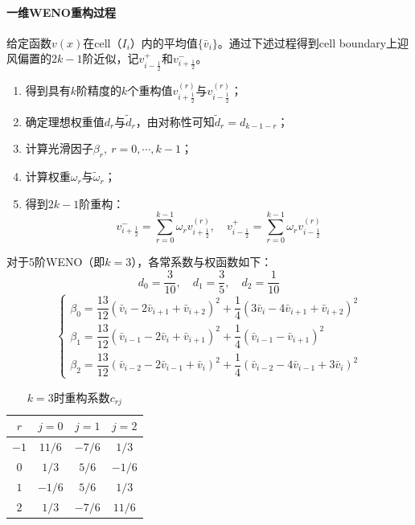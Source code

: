 \documentclass[11pt]{article}
\begin{document}
\paragraph{一维WENO重构过程} 给定函数$v(x)$在cell（$I_i$）内的平均值$\{\bar{v}_i\}$。通过下述过程得到cell boundary上迎风偏置的$2k-1$阶近似，记$v_{i-\frac{1}{2}}^+$和$v_{i+\frac{1}{2}}^-$。
\begin{enumerate}
	\item 得到具有$k$阶精度的$k$个重构值$v_{i+\frac{1}{2}}^{(r)}$与$v_{i-\frac{1}{2}}^{(r)}$；
	\item 确定理想权重值$d_r$与$\tilde{d}_r$，由对称性可知$\tilde{d}_r=d_{k-1-r}$；
	\item 计算光滑因子$\beta_r,\ r=0,\cdots,k-1$；
	\item 计算权重$\omega_r$与$\tilde{\omega}_r$；
	\item 得到$2k-1$阶重构：
	      $$
		      v_{i+\frac{1}{2}}^-=\sum_{r=0}^{k-1}\omega_rv_{i+\frac{1}{2}}^{(r)},\quad v_{i-\frac{1}{2}}^+=\sum_{r=0}^{k-1}\omega_rv_{i-\frac{1}{2}}^{(r)}
	      $$
\end{enumerate}

对于5阶WENO（即$k=3$），各常系数与权函数如下：
\begin{equation}
	d_0=\frac{3}{10},\quad d_1=\frac{3}{5},\quad d_2=\frac{1}{10}
\end{equation}
\begin{equation}
	\left\{\begin{array}{l}
		\beta_0 =\dfrac{13}{12}\left(\bar{v}_{i}-2\bar{v}_{i+1}+\bar{v}_{i+2}\right)^2+\dfrac{1}{4}\left(3\bar{v}_{i}-4\bar{v}_{i+1}+\bar{v}_{i+2}\right)^2 \\[8pt]
		\beta_1 =\dfrac{13}{12}\left(\bar{v}_{i-1}-2\bar{v}_{i}+\bar{v}_{i+1}\right)^2+\dfrac{1}{4}\left(\bar{v}_{i-1}-\bar{v}_{i+1}\right)^2               \\[8pt]
		\beta_2 =\dfrac{13}{12}\left(\bar{v}_{i-2}-2\bar{v}_{i-1}+\bar{v}_{i}\right)^2+\dfrac{1}{4}\left(\bar{v}_{i-2}-4\bar{v}_{i-1}+3\bar{v}_{i}\right)^2
	\end{array}\right.
\end{equation}
\begin{table}[htbp]
	\centering
	\caption{\label{tab:crj}$k=3$时重构系数$c_{rj}$}\vspace{1ex}
	\begin{tabular}{cccc}
		\toprule
		$r$  & $j=0$  & $j=1$  & $j=2$  \\
		\midrule
		$-1$ & $11/6$ & $-7/6$ & $1/3$  \\
		$0$  & $1/3$  & $5/6$  & $-1/6$ \\
		$1$  & $-1/6$ & $5/6$  & $1/3$  \\
		$2$  & $1/3$  & $-7/6$ & $11/6$ \\
		\bottomrule
	\end{tabular}
\end{table}
\end{document}
